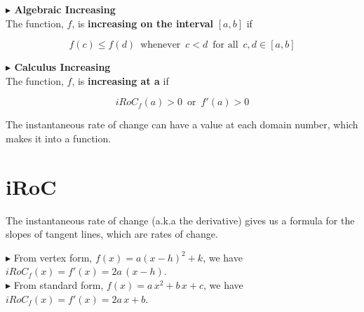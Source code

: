 \documentclass{ximera}
\begin{document}
\textbf{\textcolor{red!90!darkgray}{$\blacktriangleright$ Algebraic Increasing}} \\



The function, $f$, is \textbf{\textcolor{purple!85!blue}{increasing on the interval}} $[a, b]$ if


\[
f(c) \leq f(d) \, \text{ whenever } \, c < d \, \text{ for all } \, c, d \in [a,b]
\]









\textbf{\textcolor{red!90!darkgray}{$\blacktriangleright$ Calculus Increasing}} \\



The function, $f$, is \textbf{\textcolor{purple!85!blue}{increasing at a}} if


\[
iRoC_f(a) > 0 \, \text{ or } \, f'(a) > 0
\]




The instantaneous rate of change can have a value at each domain number, which makes it into a function.






\section{iRoC}


The instantaneous rate of change (a.k.a the derivative) gives us a formula for the slopes of tangent lines, which are rates of change.



\textbf{\textcolor{red!90!darkgray}{$\blacktriangleright$}} From vertex form, $f(x) = a (x -h)^2 + k$, we have $iRoC_f(x) = f'(x) = 2 a \, (x-h)$. \\



\textbf{\textcolor{red!90!darkgray}{$\blacktriangleright$}} From standard form, $f(x) = a \, x^2 + b \, x + c$, we have $iRoC_f(x) = f'(x) = 2 a \, x + b$. \\
\end{document}

